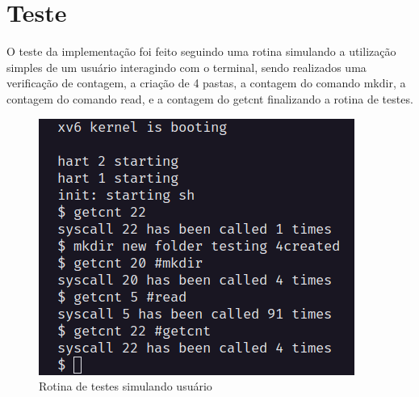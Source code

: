 \documentclass[12pt]{article}
\begin{document}
\section{Teste}
\par O teste da implementação foi feito seguindo uma rotina simulando a utilização simples de um usuário interagindo com o terminal, sendo realizados uma verificação de contagem, a criação de 4 pastas, a contagem do comando mkdir, a contagem do comando read, e a contagem do getcnt finalizando a rotina de testes.
\begin{figure}[hb]
	\centering
	\includegraphics[scale=0.8]{./teste.png}
	\caption{Rotina de testes simulando usuário}
\end{figure}
\end{document}
